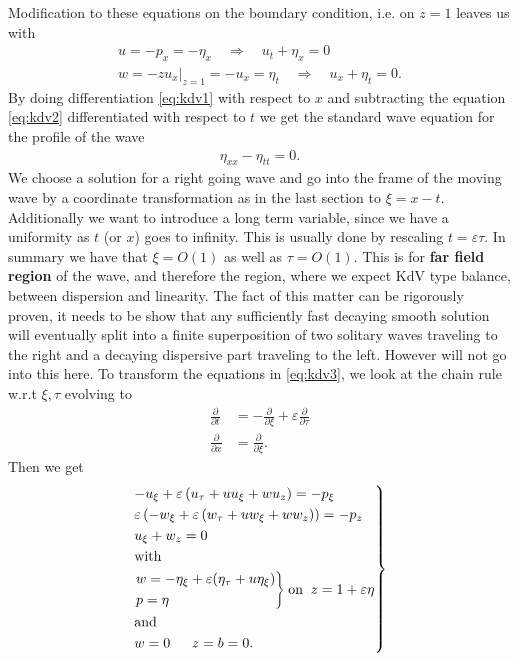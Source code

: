 Modification to these equations on the boundary condition, i.e. on $z=1$
leaves us with
\begin{align}
    u = -p_x = -\eta_x \quad \Rightarrow \quad u_t + \eta_x = 0
    \label{eq:kdv1}\\
    w = -zu_x\Big|_{z=1} = -u_x = \eta_t \quad \Rightarrow \quad u_x + \eta_t
    =0.\label{eq:kdv2}
\end{align}
By doing differentiation \ref{eq:kdv1} with respect to $x$ and subtracting
the equation \ref{eq:kdv2} differentiated with respect to $t$ we get the
standard wave equation for the profile of the wave
\begin{align}
    \eta_{x x}  - \eta_{t t} = 0 .
\end{align}
We choose a solution for a right going wave and go into the frame of the
moving wave by a coordinate transformation as in the last section to $\xi =
x- t$. Additionally we want to introduce a long term variable, since we have
a uniformity as $t$ (or $x$) goes to infinity. This is usually done by
rescaling $t = \varepsilon \tau$. In summary we have that $\xi = O(1)$ as
well as $\tau = O(1)$. This is for  \textbf{far field region} of the wave, and
therefore the region, where we expect KdV type balance, between dispersion
and linearity. The fact of this matter can be rigorously proven, it needs to
be show that any sufficiently fast decaying smooth solution will eventually
split into a finite superposition of two solitary waves traveling to the
right and a decaying dispersive part traveling to the left. However will not
go into this here. To transform the equations in \ref{eq:kdv3}, we look at
the chain rule w.r.t $\xi ,\tau$ evolving to
\begin{align}
    \frac{\partial }{\partial t} &= -\frac{\partial }{\partial \xi}
    +\varepsilon \frac{\partial }{\partial \tau} \\
    \frac{\partial }{\partial x} &= \frac{\partial }{\partial \xi}.
\end{align}
Then we get
\begin{align}\label{eq:kdv5}
    \begin{drcases}
        -u_\xi + \varepsilon\left(u_\tau + uu_\xi + w u_z  \right)  =
        -p_\xi\\
        \varepsilon\left( -w_\xi + \varepsilon\left( w_\tau + u w_\xi + w w_z
        \right)  \right)  = - p_z\\
        u_\xi + w_z = 0\\
        \text{with}\\
        \begin{drcases}
        w = -\eta_\xi+\varepsilon(\eta_\tau+u \eta_\xi)\\
        p=\eta
        \end{drcases}
        \text{on} \;\; z=1+\varepsilon\eta\\
        \text{and}\\
        w = 0 \quad \;\; z = b =0.
    \end{drcases}
\end{align}
